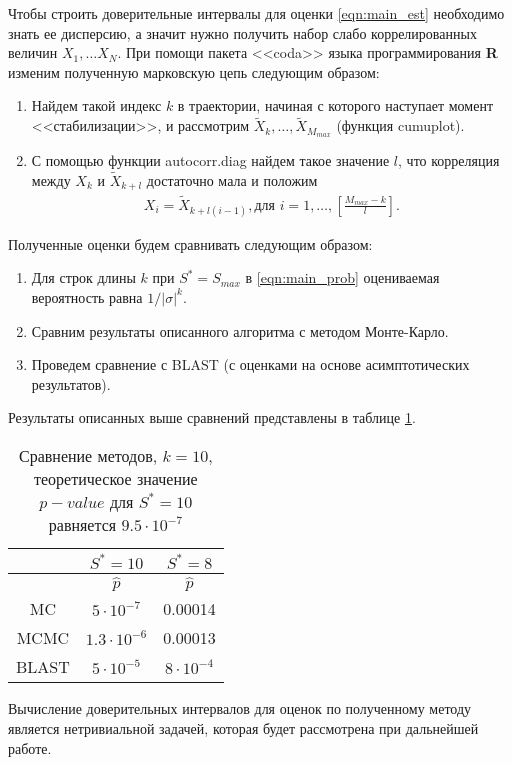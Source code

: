 \documentclass{spisok-article}
\begin{document}
Чтобы строить доверительные интервалы для оценки \eqref{eqn:main_est} необходимо знать ее дисперсию, а значит нужно получить набор слабо коррелированных  величин $X_1, \ldots X_N$.
При помощи пакета <<coda>> языка программирования \textbf{R} \cite{coda} изменим полученную марковскую цепь следующим образом:
\begin{enumerate}
\item Найдем такой индекс $k$ в траектории, начиная с которого наступает момент <<стабилизации>>, и рассмотрим $\tilde{X}_{k}, \ldots, \tilde{X}_{M_{max}}$ (функция cumuplot).
\item С помощью функции autocorr.diag найдем такое значение $l$, что корреляция между $X_{k}$ и $\tilde{X}_{k + l}$ достаточно мала и положим
\begin{gather*}
X_i = \tilde{X}_{k + l(i - 1)}, \text{для } i = 1,\ldots, \left[\frac{M_{max} - k}{l}\right].
\end{gather*} 
\end{enumerate}

Полученные оценки будем сравнивать следующим образом:
\begin{enumerate}
\item Для строк длины $k$ при $S^* = S_{max}$ в \eqref{eqn:main_prob} оцениваемая вероятность равна $1/ |\sigma|^k$.
\item Сравним результаты описанного алгоритма с методом Монте-Карло.
\item Проведем сравнение с BLAST (с оценками на основе асимптотических результатов).
\end{enumerate}
Результаты описанных выше сравнений представлены в таблице \ref{tbl:comp10}. 
\begin{table}[h]
\centering

\caption{Сравнение методов, $k = 10$, теоретическое значение $p-value$ для $S^* = 10$ равняется $9.5 \cdot 10^{-7}$} 
\label{tbl:comp10}
\begin{tabular}{|c|c|c|}
\hline
            & $S^* = 10$  & $S^* = 8$   \\ \hline
            & $\widehat{p}$        & $\widehat{p}$       \\ \hline
MC          &  $5 \cdot 10^{-7}$       &   0.00014            \\ \hline
MCMC        &  $1.3 \cdot 10^{-6}$  &   0.00013                        \\ \hline
BLAST        & $5 \cdot 10^{-5}$      & $8 \cdot 10^{-4}$                   \\ \hline
\end{tabular}
\end{table}
Вычисление доверительных интервалов для оценок по полученному методу является нетривиальной задачей, которая будет рассмотрена при дальнейшей работе.
\end{document}
